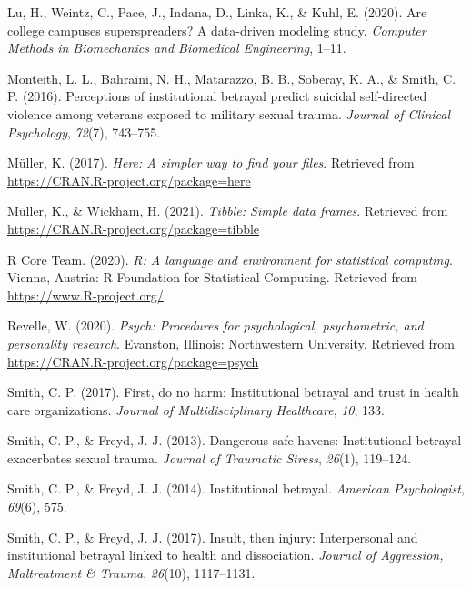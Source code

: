 \documentclass[
  english,
  man, noextraspace]{apa6}
\begin{document}
\leavevmode\hypertarget{ref-lu2020college}{}%
Lu, H., Weintz, C., Pace, J., Indana, D., Linka, K., \& Kuhl, E. (2020). Are college campuses superspreaders? A data-driven modeling study. \emph{Computer Methods in Biomechanics and Biomedical Engineering}, 1--11.

\leavevmode\hypertarget{ref-monteith2016}{}%
Monteith, L. L., Bahraini, N. H., Matarazzo, B. B., Soberay, K. A., \& Smith, C. P. (2016). Perceptions of institutional betrayal predict suicidal self-directed violence among veterans exposed to military sexual trauma. \emph{Journal of Clinical Psychology}, \emph{72}(7), 743--755.

\leavevmode\hypertarget{ref-R-here}{}%
Müller, K. (2017). \emph{Here: A simpler way to find your files}. Retrieved from \url{https://CRAN.R-project.org/package=here}

\leavevmode\hypertarget{ref-R-tibble}{}%
Müller, K., \& Wickham, H. (2021). \emph{Tibble: Simple data frames}. Retrieved from \url{https://CRAN.R-project.org/package=tibble}

\leavevmode\hypertarget{ref-R-base}{}%
R Core Team. (2020). \emph{R: A language and environment for statistical computing}. Vienna, Austria: R Foundation for Statistical Computing. Retrieved from \url{https://www.R-project.org/}

\leavevmode\hypertarget{ref-R-psych}{}%
Revelle, W. (2020). \emph{Psych: Procedures for psychological, psychometric, and personality research}. Evanston, Illinois: Northwestern University. Retrieved from \url{https://CRAN.R-project.org/package=psych}

\leavevmode\hypertarget{ref-smith2017first}{}%
Smith, C. P. (2017). First, do no harm: Institutional betrayal and trust in health care organizations. \emph{Journal of Multidisciplinary Healthcare}, \emph{10}, 133.

\leavevmode\hypertarget{ref-smith2013}{}%
Smith, C. P., \& Freyd, J. J. (2013). Dangerous safe havens: Institutional betrayal exacerbates sexual trauma. \emph{Journal of Traumatic Stress}, \emph{26}(1), 119--124.

\leavevmode\hypertarget{ref-smith2014}{}%
Smith, C. P., \& Freyd, J. J. (2014). Institutional betrayal. \emph{American Psychologist}, \emph{69}(6), 575.

\leavevmode\hypertarget{ref-smith2017}{}%
Smith, C. P., \& Freyd, J. J. (2017). Insult, then injury: Interpersonal and institutional betrayal linked to health and dissociation. \emph{Journal of Aggression, Maltreatment \& Trauma}, \emph{26}(10), 1117--1131.
\end{document}
